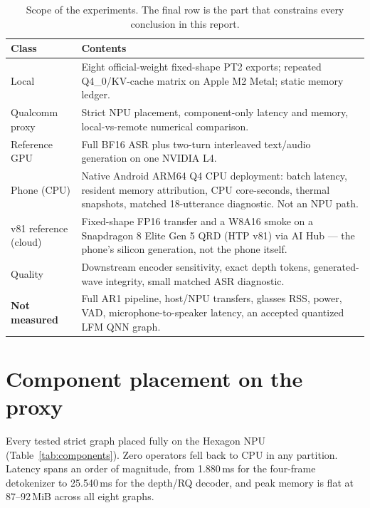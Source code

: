 \documentclass[10pt,twocolumn,letterpaper]{article}
\begin{document}
\begin{table}[t]
\centering
\small
\caption{Scope of the experiments. The final row is the part that constrains
every conclusion in this report.}
\label{tab:scope}
\begin{tabular}{@{}p{}p{}@{}}
\toprule
\textbf{Class} & \textbf{Contents} \\
\midrule
Local & Eight official-weight fixed-shape PT2 exports; repeated
Q4\_0/KV-cache matrix on Apple M2 Metal; static memory ledger. \\
\addlinespace[2pt]
Qualcomm proxy & Strict NPU placement, component-only latency and memory,
local-vs-remote numerical comparison. \\
\addlinespace[2pt]
Reference GPU & Full BF16 ASR plus two-turn interleaved text/audio generation
on one NVIDIA L4. \\
\addlinespace[2pt]
Phone (CPU) & Native Android ARM64 Q4 CPU deployment: batch latency, resident
memory attribution, CPU core-seconds, thermal snapshots, matched 18-utterance
diagnostic. Not an NPU path. \\
\addlinespace[2pt]
v81 reference (cloud) & Fixed-shape FP16 transfer and a W8A16 smoke on a
Snapdragon 8 Elite Gen 5 QRD (HTP v81) via AI Hub --- the phone's silicon
generation, not the phone itself. \\
\addlinespace[2pt]
Quality & Downstream encoder sensitivity, exact depth tokens, generated-wave
integrity, small matched ASR diagnostic. \\
\addlinespace[2pt]
\textbf{Not measured} & Full AR1 pipeline, host/NPU transfers, glasses RSS,
power, VAD, microphone-to-speaker latency, an accepted quantized LFM QNN
graph. \\
\bottomrule
\end{tabular}
\end{table}

\section{Component placement on the proxy}
\label{sec:components}

Every tested strict graph placed fully on the Hexagon NPU
(Table~\ref{tab:components}). Zero operators fell back to CPU in any
partition. Latency spans an order of magnitude, from 1.880\,ms for the
four-frame detokenizer to 25.540\,ms for the depth/RQ decoder, and peak memory
is flat at 87--92\,MiB across all eight graphs.
\end{document}
